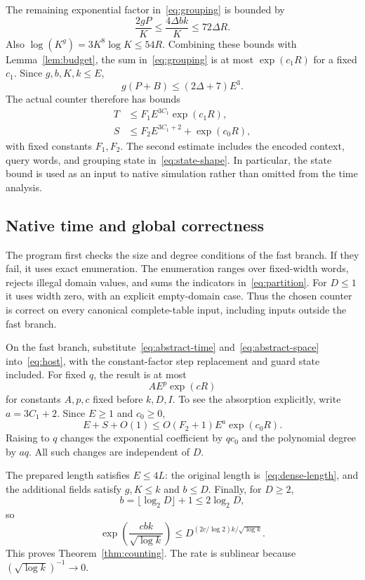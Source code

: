 \documentclass[11pt,reqno]{amsart}
\numberwithin{equation}{section}
\theoremstyle{definition}
\theoremstyle{remark}
\begin{document}
The remaining exponential factor in~\eqref{eq:grouping} is bounded by
\begin{equation}\label{eq:entry-exponent}
 \frac{2gP}{K}\le\frac{4\Delta bk}{K}\le72\Delta R.
\end{equation}
Also $\log(K^g)=3K^8\log K\le54R$. Combining these bounds with Lemma~\ref{lem:budget}, the sum in~\eqref{eq:grouping} is at most $\exp(c_1R)$ for a fixed $c_1$. Since $g,b,K,k\le E$,
\[
 g(P+B)\le(2\Delta+7)E^3.
\]
The actual counter therefore has bounds
\begin{align}
 T&\le F_1E^{3C_1}\exp(c_1R),\label{eq:abstract-time}\\
 S&\le F_2E^{3C_1+2}+\exp(c_0R),\label{eq:abstract-space}
\end{align}
with fixed constants $F_1,F_2$. The second estimate includes the encoded context, query words, and grouping state in~\eqref{eq:state-shape}. In particular, the state bound is used as an input to native simulation rather than omitted from the time analysis.

\subsection{Native time and global correctness}

The program first checks the size and degree conditions of the fast branch. If they fail, it uses exact enumeration. The enumeration ranges over fixed-width words, rejects illegal domain values, and sums the indicators in~\eqref{eq:partition}. For $D\le1$ it uses width zero, with an explicit empty-domain case. Thus the chosen counter is correct on every canonical complete-table input, including inputs outside the fast branch.

On the fast branch, substitute~\eqref{eq:abstract-time} and~\eqref{eq:abstract-space} into~\eqref{eq:host}, with the constant-factor step replacement and guard state included. For fixed $q$, the result is at most
\begin{equation}\label{eq:native-exp}
 A E^p\exp(cR)
\end{equation}
for constants $A,p,c$ fixed before $k,D,I$. To see the absorption explicitly, write $a=3C_1+2$. Since $E\ge1$ and $c_0\ge0$,
\[
 E+S+O(1)\le O(F_2+1)E^a\exp(c_0R).
\]
Raising to $q$ changes the exponential coefficient by $qc_0$ and the polynomial degree by $aq$. All such changes are independent of $D$.

The prepared length satisfies $E\le4L$: the original length is~\eqref{eq:dense-length}, and the additional fields satisfy $g,K\le k$ and $b\le D$. Finally, for $D\ge2$,
\[
 b=\lfloor\log_2D\rfloor+1\le2\log_2D,
\]
so
\[
 \exp\left(\frac{cbk}{\sqrt{\log k}}\right)
 \le D^{(2c/\log2)k/\sqrt{\log k}}.
\]
This proves Theorem~\ref{thm:counting}. The rate is sublinear because $(\sqrt{\log k})^{-1}\to0$.
\end{document}
